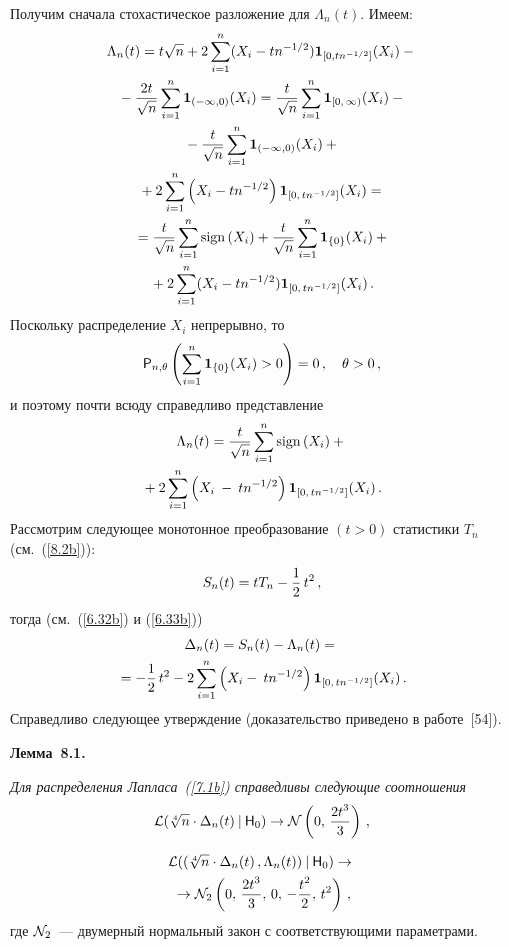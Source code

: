 \begin{multicols}{2}
Получим сначала стохастическое разложение для $\Lambda_n(t)$.
Имеем:
\begin{multline*}
\Lambda_n(t)=t\sqrt n+2\sum\limits_{i=1}^{n}
(X_i - tn^{-1/2}){\bf 1}_{[0,tn^{-1/2}]}(X_i)-{}\\
{}-\displaystyle\frac{\displaystyle 2t\mathstrut}{\displaystyle \sqrt n\mathstrut}
\sum\limits_{i=1}^n {\bf 1}_{(-\infty,0)}(X_i)=
\displaystyle\frac{\displaystyle t\mathstrut}{\displaystyle \sqrt n\mathstrut}\sum \limits_{i=1}^{n} {\bf 1}_{[0,\,\infty)}(X_i)-{}\\
{}- 
\displaystyle\frac{\displaystyle t\mathstrut}{\displaystyle \sqrt n\mathstrut}\sum \limits_{i=1}^n {\bf 1}_{(-\infty, 0)}(X_i)+{}\\
{}+
2\sum \limits_{i=1}^n \left (X_i-tn^{-1/2}\right ){\bf 1}_{[0,\,tn^{-1/2}]}(X_i)={}\\
{}=\displaystyle\frac{\displaystyle t\mathstrut}{\displaystyle \sqrt n\mathstrut}\sum \limits_{i=1}^n \mathrm{sign}\left (X_i\right )+
\displaystyle\frac{\displaystyle t\mathstrut}{\displaystyle \sqrt n\mathstrut}\sum \limits_{i=1}^n {\bf 1}_{\{0\}}(X_i)+{}\\
{}+
2\sum \limits_{i=1}^n (X_i-tn^{-1/2}){\bf 1}_{[0,\,tn^{-1/2}]}(X_i)\,.
\end{multline*}
Поскольку распределение $X_i$ непрерывно, то
$$
{\sf P}_{n,\theta}\left (\sum \limits_{i=1}^n {{\bf 1}_{\{0\}}}
(X_i)>0\right )=0\,, \quad  \theta>0\,,
$$
и поэтому почти всюду справедливо представление
\begin{multline*}
\Lambda_n(t)=\displaystyle\frac{\displaystyle t\mathstrut}{\displaystyle \sqrt n\mathstrut}
\sum \limits_{i=1}^n \mathrm{sign}\left(X_i\right )+{}\\
{}+
2\sum\limits_{i=1}^n\left ( X_i\:-\: tn^{-1/2}\right )
{\bf 1}_{[0,\,tn^{-1/2}]}(X_i)\,.
\end{multline*}
Рассмотрим следующее монотонное преобразование
$(t>0)$ статистики $T_n$ (см.~(\ref{8.2b})):
$$
S_n(t) = tT_n-\displaystyle\frac{\displaystyle 1\mathstrut}{\displaystyle 2\mathstrut}\,t^2\,,
$$
тогда (см.~(\ref{6.32b}) и (\ref{6.33b}))
\begin{multline*}
\Delta_n(t)=S_n(t)-\Lambda_n(t)={}\\
{}=-\displaystyle\frac{\displaystyle 1\mathstrut}{\displaystyle 2\mathstrut}\,t^2 -
2 \sum\limits_{i=1}^n \left (X_i-\:tn^{-1/2}\right )
{\bf 1}_{[0,\,tn^{-1/2}]}(X_i)\,.
\end{multline*}
Справедливо следующее утверждение (доказательство приведено в
работе~[54]).
\medskip

\noindent
{\bf Лемма~8.1.} {\it Для распределения Лапласа~(\ref{7.1b}) справедливы
следующие соотношения
$$
{\cal L}(\sqrt[4]n \cdot  \Delta_n(t)\:|\:{\sf H}_0) \to
{\cal N}\left (0,\, \displaystyle\frac{\displaystyle 2t^3\mathstrut}{\displaystyle 3\mathstrut}\right)\,,
$$

\noindent
\begin{multline*}
{\cal L}((\sqrt[4] n\cdot \Delta_n(t)\,,\Lambda_n(t))\:|\:{\sf H}_0) \to{}\\
{}\to 
{\cal N}_2 \left (0,\, \displaystyle\frac{\displaystyle 2t^3\mathstrut}{\displaystyle 3\mathstrut},\,0,\, -\displaystyle\frac{\displaystyle t^2\mathstrut}{\displaystyle 2\mathstrut},\, t^2\right )\,,
\end{multline*}
где ${\cal N}_2$~--- двумерный нормальный закон с
соответствующими параметрами. }


\end{multicols}
